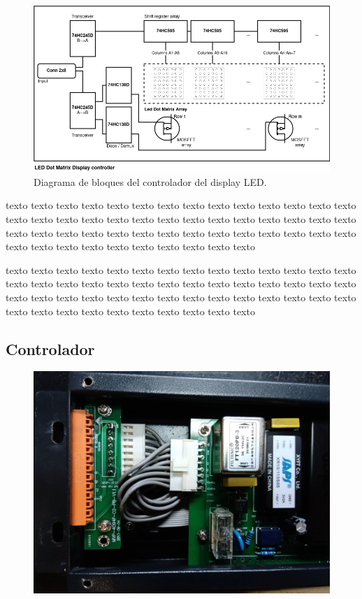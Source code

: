 \documentclass[
11pt, %
]{charter}
\begin{document}
\begin{figure}[htpb]
\centering 
\includegraphics[width=1\textwidth]{./Pics/blockDiagram.png}
\caption{Diagrama de bloques del controlador del display LED.}
\label{fig:blockDiagram LED display}
\end{figure}

texto texto texto texto texto texto texto texto texto texto texto texto texto texto texto texto texto texto texto texto texto texto texto texto texto texto texto texto texto texto texto texto texto texto texto texto texto texto texto texto texto texto texto texto texto texto texto texto texto texto texto texto 

	

texto texto texto texto texto texto texto texto texto texto texto texto texto texto texto texto texto texto texto texto texto texto texto texto texto texto texto texto texto texto texto texto texto texto texto texto texto texto texto texto texto texto texto texto texto texto texto texto texto texto texto texto 
\subsection{Controlador}

\begin{figure}[htpb]
\centering 
\includegraphics[width=1\textwidth]{./Pics/IMG_20210322_130602.jpg}
\caption{}
\label{fig:Placa de control ensamblada}
\end{figure}
\end{document}
